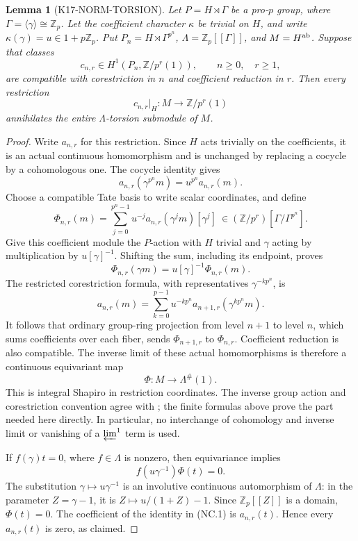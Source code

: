 \documentclass[11pt,a4paper]{article}
\newtheorem{lemma}[theorem]{Lemma}
\theoremstyle{definition}
\begin{document}
\begin{lemma}[K17-NORM-TORSION]\label{lem:norm-torsion}
Let \(P=H\rtimes\Gamma\) be a pro-\(p\) group, where
\(\Gamma=\langle\gamma\rangle\cong\mathbb Z_p\).  Let the coefficient
character \(\kappa\) be trivial on \(H\), and write
\(\kappa(\gamma)=u\in1+p\mathbb Z_p\).
Put \(P_n=H\rtimes\Gamma^{p^n}\),
\(\Lambda=\mathbb Z_p[[\Gamma]]\), and \(M=H^{\rm ab}\).
Suppose that classes
\[
 c_{n,r}\in H^1(P_n,\mathbb Z/p^r(1)),
 \qquad n\geq0,\quad r\geq1,
\]
are compatible with corestriction in \(n\) and coefficient reduction
in \(r\).  Then every restriction
\[
 c_{n,r}|_H:M\longrightarrow\mathbb Z/p^r(1)
\]
annihilates the entire \(\Lambda\)-torsion submodule of \(M\).
\end{lemma}

\begin{proof}
Write \(a_{n,r}\) for this restriction.  Since \(H\) acts trivially
on the coefficients, it is an actual continuous homomorphism and is
unchanged by replacing a cocycle by a cohomologous one.  The cocycle
identity gives
\[
 a_{n,r}(\gamma^{p^n}m)=u^{p^n}a_{n,r}(m).
\]
Choose a compatible Tate basis to write scalar coordinates, and define
\[
 \Phi_{n,r}(m)=
 \sum_{j=0}^{p^n-1}u^{-j}a_{n,r}(\gamma^j m)[\gamma^j]
 \ \in(\mathbb Z/p^r)[\Gamma/\Gamma^{p^n}].                 \tag{NC.1}
\]
Give this coefficient module the \(P\)-action with \(H\) trivial and
\(\gamma\) acting by multiplication by \(u[\gamma]^{-1}\).
Shifting the sum, including its endpoint, proves
\[
 \Phi_{n,r}(\gamma m)=u[\gamma]^{-1}\Phi_{n,r}(m).
                                                               \tag{NC.2}
\]
The restricted corestriction formula, with representatives
\(\gamma^{-kp^n}\), is
\[
 a_{n,r}(m)=
 \sum_{k=0}^{p-1}u^{-kp^n}a_{n+1,r}(\gamma^{kp^n}m).
                                                               \tag{NC.3}
\]
It follows that ordinary group-ring projection from level \(n+1\)
to level \(n\), which sums coefficients over each fiber, sends
\(\Phi_{n+1,r}\) to \(\Phi_{n,r}\).  Coefficient reduction is also
compatible.  The inverse limit of these actual homomorphisms is
therefore a continuous equivariant map
\[
                  \Phi:M\longrightarrow\Lambda^\#(1).     \tag{NC.4}
\]
This is integral Shapiro in restriction coordinates.  The inverse
group action and corestriction convention agree with
\cite[\S2.5, pp.~16--17]{SharifiReciprocity2017};
the finite formulas above prove the part needed here directly.
In particular, no interchange of cohomology and inverse limit or
vanishing of a \(\varprojlim^1\) term is used.

If \(f(\gamma)t=0\), where \(f\in\Lambda\) is nonzero, then
equivariance implies
\[
                   f(u\gamma^{-1})\Phi(t)=0.
\]
The substitution \(\gamma\mapsto u\gamma^{-1}\) is an involutive
continuous automorphism of \(\Lambda\): in the parameter
\(Z=\gamma-1\), it is \(Z\mapsto u/(1+Z)-1\).
Since \(\mathbb Z_p[[Z]]\) is a domain, \(\Phi(t)=0\).
The coefficient of the identity in (NC.1) is \(a_{n,r}(t)\).
Hence every \(a_{n,r}(t)\) is zero, as claimed.
\end{proof}
\end{document}
